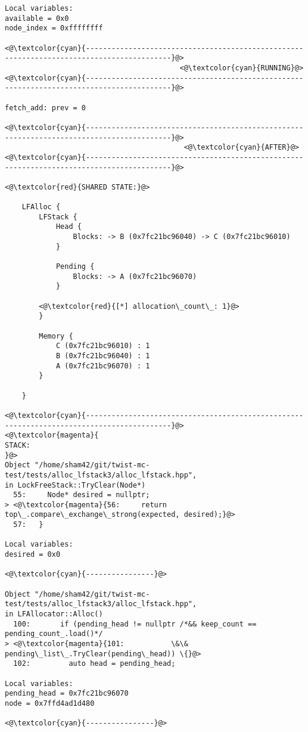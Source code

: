\begin{adjustwidth}{-3.3cm}{-1cm}
\begin{allintypewriter}
\begin{multicols*}{2}
\begin{lstlisting}[numbers=none]
Local variables: 
available = 0x0
node_index = 0xffffffff

<@\textcolor{cyan}{------------------------------------------------------------------------------------------}@>
                                         <@\textcolor{cyan}{RUNNING}@>
<@\textcolor{cyan}{------------------------------------------------------------------------------------------}@>

fetch_add: prev = 0

<@\textcolor{cyan}{------------------------------------------------------------------------------------------}@>
                                          <@\textcolor{cyan}{AFTER}@>
<@\textcolor{cyan}{------------------------------------------------------------------------------------------}@>

<@\textcolor{red}{SHARED STATE:}@>

    LFAlloc {
	    LFStack {
		    Head {
			    Blocks: -> B (0x7fc21bc96040) -> C (0x7fc21bc96010) 
		    }

		    Pending {
			    Blocks: -> A (0x7fc21bc96070) 
		    }

		<@\textcolor{red}{[*] allocation\_count\_: 1}@>
	    }

	    Memory {
		    C (0x7fc21bc96010) : 1
		    B (0x7fc21bc96040) : 1
		    A (0x7fc21bc96070) : 1
	    }

    }

<@\textcolor{cyan}{------------------------------------------------------------------------------------------}@>
<@\textcolor{magenta}{
STACK:
}@>
Object "/home/sham42/git/twist-mc-test/tests/alloc_lfstack3/alloc_lfstack.hpp",
in LockFreeStack::TryClear(Node*)
  55:     Node* desired = nullptr;
> <@\textcolor{magenta}{56:     return top\_.compare\_exchange\_strong(expected, desired);}@>
  57:   }

Local variables: 
desired = 0x0

<@\textcolor{cyan}{----------------}@>

Object "/home/sham42/git/twist-mc-test/tests/alloc_lfstack3/alloc_lfstack.hpp",
in LFAllocator::Alloc()
  100:       if (pending_head != nullptr /*&& keep_count == pending_count_.load()*/
> <@\textcolor{magenta}{101:           \&\& pending\_list\_.TryClear(pending\_head)) \{}@>
  102:         auto head = pending_head;

Local variables: 
pending_head = 0x7fc21bc96070
node = 0x7ffd4ad1d480

<@\textcolor{cyan}{----------------}@>


\end{lstlisting}
\end{multicols*}
\end{allintypewriter}
\end{adjustwidth}

